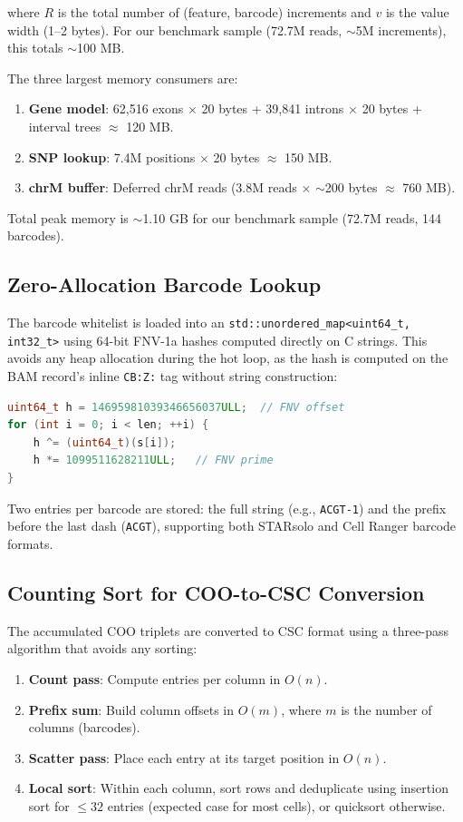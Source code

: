 \documentclass[11pt,a4paper]{article}
\begin{document}
where $R$ is the total number of (feature, barcode) increments and $v$ is the value width (1--2 bytes). For our benchmark sample (72.7M reads, $\sim$5M increments), this totals $\sim$100 MB.

The three largest memory consumers are:

\begin{enumerate}
    \item \textbf{Gene model}: 62,516 exons $\times$ 20 bytes + 39,841 introns $\times$ 20 bytes + interval trees $\approx$ 120 MB.
    \item \textbf{SNP lookup}: 7.4M positions $\times$ 20 bytes $\approx$ 150 MB.
    \item \textbf{chrM buffer}: Deferred chrM reads (3.8M reads $\times$ $\sim$200 bytes $\approx$ 760 MB).
\end{enumerate}

Total peak memory is $\sim$1.10 GB for our benchmark sample (72.7M reads, 144 barcodes).

\subsection{Zero-Allocation Barcode Lookup}

The barcode whitelist is loaded into an \texttt{std::unordered\_map<uint64\_t, int32\_t>} using 64-bit FNV-1a hashes computed directly on C strings. This avoids any heap allocation during the hot loop, as the hash is computed on the BAM record's inline \texttt{CB:Z:} tag without string construction:

\begin{lstlisting}[language=C++]
uint64_t h = 14695981039346656037ULL;  // FNV offset
for (int i = 0; i < len; ++i) {
    h ^= (uint64_t)(s[i]);
    h *= 1099511628211ULL;   // FNV prime
}
\end{lstlisting}

Two entries per barcode are stored: the full string (e.g., \texttt{ACGT-1}) and the prefix before the last dash (\texttt{ACGT}), supporting both STARsolo and Cell Ranger barcode formats.

\subsection{Counting Sort for COO-to-CSC Conversion}

The accumulated COO triplets are converted to CSC format using a three-pass algorithm that avoids any sorting:

\begin{enumerate}
    \item \textbf{Count pass}: Compute entries per column in $O(n)$.
    \item \textbf{Prefix sum}: Build column offsets in $O(m)$, where $m$ is the number of columns (barcodes).
    \item \textbf{Scatter pass}: Place each entry at its target position in $O(n)$.
    \item \textbf{Local sort}: Within each column, sort rows and deduplicate using insertion sort for $\leq 32$ entries (expected case for most cells), or quicksort otherwise.
\end{enumerate}
\end{document}
